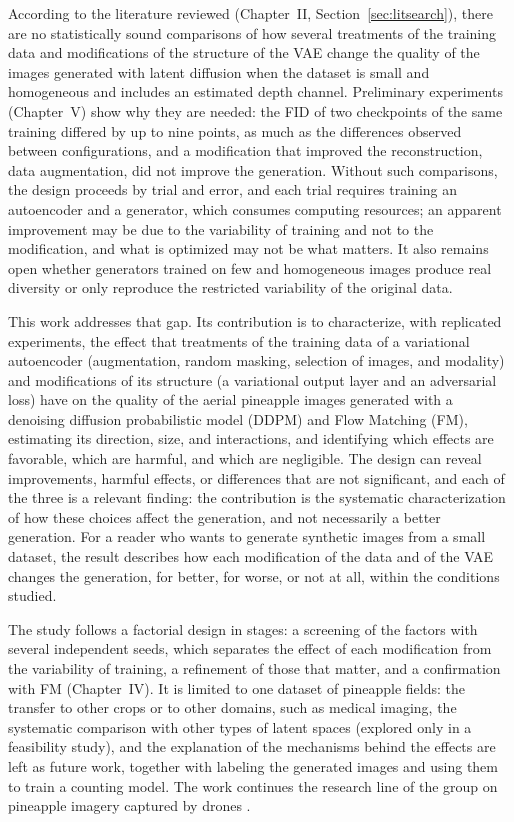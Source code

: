 According to the literature reviewed (Chapter~II, Section~\ref{sec:litsearch}), there are no statistically sound comparisons of how several treatments of the training data and modifications of the structure of the VAE change the quality of the images generated with latent diffusion when the dataset is small and homogeneous and includes an estimated depth channel. Preliminary experiments (Chapter~V) show why they are needed: the FID of two checkpoints of the same training differed by up to nine points, as much as the differences observed between configurations, and a modification that improved the reconstruction, data augmentation, did not improve the generation. Without such comparisons, the design proceeds by trial and error, and each trial requires training an autoencoder and a generator, which consumes computing resources; an apparent improvement may be due to the variability of training and not to the modification, and what is optimized may not be what matters. It also remains open whether generators trained on few and homogeneous images produce real diversity or only reproduce the restricted variability of the original data.

This work addresses that gap. Its contribution is to characterize, with replicated experiments, the effect that treatments of the training data of a variational autoencoder (augmentation, random masking, selection of images, and modality) and modifications of its structure (a variational output layer and an adversarial loss) have on the quality of the aerial pineapple images generated with a denoising diffusion probabilistic model (DDPM) and Flow Matching (FM), estimating its direction, size, and interactions, and identifying which effects are favorable, which are harmful, and which are negligible. The design can reveal improvements, harmful effects, or differences that are not significant, and each of the three is a relevant finding: the contribution is the systematic characterization of how these choices affect the generation, and not necessarily a better generation. For a reader who wants to generate synthetic images from a small dataset, the result describes how each modification of the data and of the VAE changes the generation, for better, for worse, or not at all, within the conditions studied.

The study follows a factorial design in stages: a screening of the factors with several independent seeds, which separates the effect of each modification from the variability of training, a refinement of those that matter, and a confirmation with FM (Chapter~IV). It is limited to one dataset of pineapple fields: the transfer to other crops or to other domains, such as medical imaging, the systematic comparison with other types of latent spaces (explored only in a feasibility study), and the explanation of the mechanisms behind the effects are left as future work, together with labeling the generated images and using them to train a counting model. The work continues the research line of the group on pineapple imagery captured by drones \cite{XieLi2024,Gonzalez2026}.

